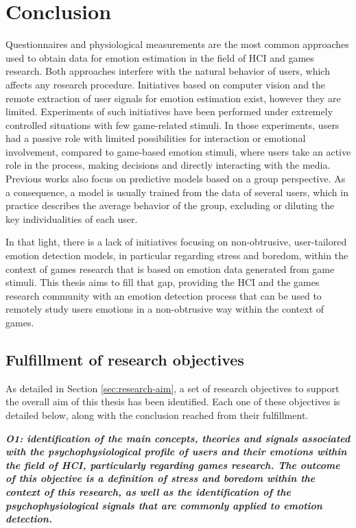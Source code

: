 \chapter{Conclusion}
\label{ch:conclusion}

Questionnaires and physiological measurements are the most common approaches used to obtain data for emotion estimation in the field of HCI and games research. Both approaches interfere with the natural behavior of users, which affects any research procedure. Initiatives based on computer vision and the remote extraction of user signals for emotion estimation exist, however they are limited. Experiments of such initiatives have been performed under extremely controlled situations with few game-related stimuli. In those experiments, users had a passive role with limited possibilities for interaction or emotional involvement, compared to game-based emotion stimuli, where users take an active role in the process, making decisions and directly interacting with the media. Previous works also focus on predictive models based on a group perspective. As a consequence, a model is usually trained from the data of several users, which in practice describes the average behavior of the group, excluding or diluting the key individualities of each user.

In that light, there is a lack of initiatives focusing on non-obtrusive, user-tailored emotion detection models, in particular regarding stress and boredom, within the context of games research that is based on emotion data generated from game stimuli. This thesis aims to fill that gap, providing the HCI and the games research community with an emotion detection process that can be used to remotely study users emotions in a non-obtrusive way within the context of games.

\section{Fulfillment of research objectives}

As detailed in Section \ref{sec:research-aim}, a set of research objectives to support the overall aim of this thesis has been identified. Each one of these objectives is detailed below, along with the conclusion reached from their fulfillment.

\textit{\textbf{O1: identification of the main concepts, theories and signals associated with the psychophysiological profile of users and their emotions within the field of HCI, particularly regarding games research. The outcome of this objective is a definition of stress and boredom within the context of this research, as well as the identification of the psychophysiological signals that are commonly applied to emotion detection.}}

